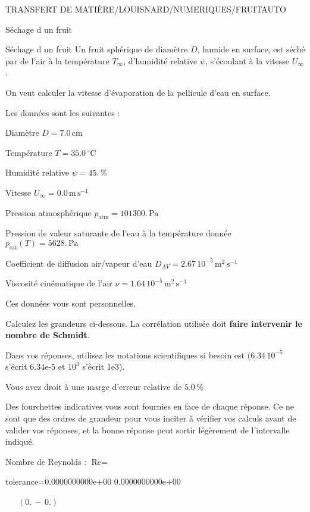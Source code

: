 \documentclass[12pt]{article}
\begin{document}
\begin{quiz}{TRANSFERT DE MATIÈRE/LOUISNARD/NUMERIQUES/FRUITAUTO}
\begin{cloze}{Séchage d un fruit}
\end{cloze} 


 \begin{cloze}{Séchage d un fruit} 
Un fruit sphérique de diamètre $D$, humide en surface, est séché par de l'air à la température $T_\infty$, d'humidité relative $\psi$, s'écoulant à la vitesse $U_\infty$.

On veut calculer la vitesse d'évaporation de la pellicule d'eau en surface.

 

Les données sont les suivantes :

 

Diamètre $D = 7.0\,  \mathrm{cm} $

Température $T = 35.0\,  \mathrm{^\circ\mathrm{C}} $

Humidité relative $\psi = 45.\, \% $

Vitesse $U_\infty = 0.0\,  \mathrm{m}\,  \mathrm{s}^{-1} $

Pression atmosphérique $p_{\text{atm}} = 101300.\,  \mathrm{Pa} $

Pression de valeur saturante de l’eau à la température donnée $p_{\text{sat}}(T) = 5628.\,  \mathrm{Pa} $

Coefficient de diffusion air/vapeur d’eau $D_{AV} =  2.67 \, 10^{-5} \,  \mathrm{m}^{2}\,  \mathrm{s}^{-1} $

Viscosité cinématique de l’air $\nu =  1.64 \, 10^{-5} \,  \mathrm{m}^{2}\,  \mathrm{s}^{-1} $

Ces données vous sont personnelles.

 

Calculez les grandeurs ci-dessous. La corrélation utilisée doit \textbf{faire intervenir le nombre de Schmidt}.

Dans vos réponses, utilisez les notations scientifiques si besoin est ($6.34\, 10^{-5}$ s'écrit 6.34e-5 et $10^{3}$ s'écrit 1e3).

Vous avez droit à une marge d'erreur relative de $5.0\, \% $

Des fourchettes indicatives vous sont fournies en face de chaque réponse. Ce ne sont que des ordres de grandeur pour vous inciter à vérifier vos calculs avant de valider vos réponses, et la bonne réponse peut sortir légèrement de l'intervalle indiqué.

 

Nombre de Reynolds : $\text{Re} =  $
\begin{numerical}[points=1] 
\item[tolerance={0.0000000000e+00}] 0.0000000000e+00 
\end{numerical} 
 $\,$ 
 $ \quad (0. \, - \, 0.) $ 


\end{cloze}
\end{quiz}
\end{document}
